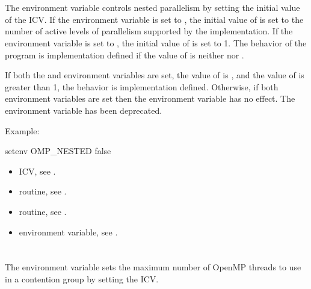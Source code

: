 \section{}
\label{sec:OMP_NESTED}
The  environment variable controls nested parallelism by
setting the initial value of the  ICV. If the
environment variable is set to , the initial value of
 is set to the number of active levels of
parallelism supported by the implementation. If the environment variable is
set to , the initial value of 
is set to 1. The behavior of the program is implementation defined if the
value of  is neither  nor .

If both the  and  environment
variables are set, the value of  is , and
the value of  is greater than 1, the behavior is
implementation defined. Otherwise, if both environment variables are set then
the  environment variable has no effect.
The  environment variable has been deprecated.


Example:
\begin{ompEnv}
setenv OMP_NESTED false
\end{ompEnv}

\crossreferences
\begin{itemize}
\item {} ICV, see .

\item {} routine, see .

\item {} routine, see .

\item {} environment variable, see .
\end{itemize}











\section{}
\label{sec:OMP_THREAD_LIMIT}
The  environment variable sets the maximum number of OpenMP threads to use in a contention group by setting the  ICV.

